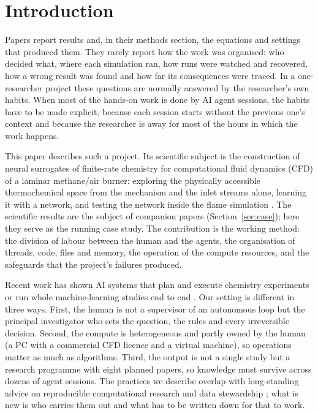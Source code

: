 \documentclass[preprint,review,12pt]{elsarticle}
\begin{document}
\section{Introduction}

Papers report results and, in their methods section, the equations and settings that produced them. They rarely report
how the work was organised: who decided what, where each simulation ran, how runs were watched and recovered, how a
wrong result was found and how far its consequences were traced. In a one-researcher project these questions are
normally answered by the researcher's own habits. When most of the hands-on work is done by AI agent sessions, the
habits have to be made explicit, because each session starts without the previous one's context and because the
researcher is away for most of the hours in which the work happens.

This paper describes such a project. Its scientific subject is the construction of neural surrogates of finite-rate
chemistry for computational fluid dynamics (CFD) of a laminar methane/air burner: exploring the physically accessible
thermochemical space from the mechanism and the inlet streams alone, learning it with a network, and testing the
network inside the flame simulation \cite{pope1997isat,christo1996ann,blasco1998ann}. The scientific results are the
subject of companion papers (Section~\ref{sec:case}); here they serve as the running case study. The contribution is
the working method: the division of labour between the human and the agents, the organisation of threads, code,
files and memory, the operation of the compute resources, and the safeguards that the project's failures produced.

Recent work has shown AI systems that plan and execute chemistry experiments \cite{boiko2023autonomous} or run whole
machine-learning studies end to end \cite{lu2024aiscientist}. Our setting is different in three ways. First, the human
is not a supervisor of an autonomous loop but the principal investigator who sets the question, the rules and every
irreversible decision. Second, the compute is heterogeneous and partly owned by the human (a PC with a commercial CFD
licence and a virtual machine), so operations matter as much as algorithms. Third, the output is not a single study but
a research programme with eight planned papers, so knowledge must survive across dozens of agent sessions. The practices
we describe overlap with long-standing advice on reproducible computational research
\cite{sandve2013tenrules,wilson2017goodenough} and data stewardship \cite{wilkinson2016fair}; what is new is who carries
them out and what has to be written down for that to work.
\end{document}
